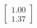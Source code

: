 \documentclass[preview]{standalone}
\begin{document}
\begin{align*}
\begin{bmatrix} 1.00 \\ 1.37 \end{bmatrix}
\end{align*}
\end{document}
